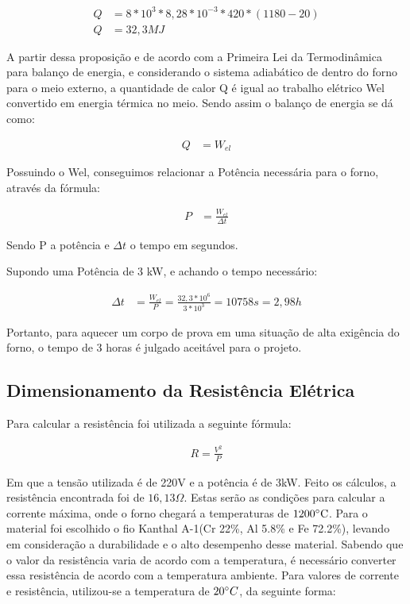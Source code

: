\begin{align}
Q &= 8*10^{3}*8,28*10^{-3}*420*(1180-20) \\
\nonumber
Q &= 32,3 MJ
\end{align}

A partir dessa proposição e de acordo com a Primeira Lei da Termodinâmica para balanço de energia, e considerando o sistema adiabático de dentro do forno para o meio externo, a quantidade de calor Q é igual ao trabalho elétrico Wel convertido em energia térmica no meio. Sendo assim o balanço de energia se dá como:

\begin{align}
Q &= W_{el}
\end{align}

Possuindo o Wel, conseguimos relacionar a Potência necessária para o forno, através da fórmula:

\begin{align}
P &= \frac{W_{el}}{\Delta t}
\end{align}

Sendo P a potência e $\Delta t$ o tempo em segundos.

Supondo uma Potência de 3 kW, e achando o tempo necessário:

\begin{align}
\Delta t &= \frac{W_{el}}{P} = \frac{32,3*10^6}{3*10^3} = 10758s = 2,98h
\end{align}

Portanto, para aquecer um corpo de prova em uma situação de alta exigência do forno, o tempo de 3 horas é julgado aceitável para o projeto.

\subsection{Dimensionamento da Resistência Elétrica}

Para calcular a resistência foi utilizada a seguinte fórmula:

\begin{align}
R = \frac{V^2}{P}
\end{align}

Em que a tensão utilizada é de 220V e a potência é de 3kW. Feito os cálculos, a resistência encontrada foi de $16,13 \Omega$. Estas serão as condições para calcular a corrente máxima, onde o forno chegará a temperaturas de $1200 \degree \text{C}$. Para o material foi escolhido o fio Kanthal A-1(Cr 22\%, Al 5.8\% e Fe 72.2\%), levando em consideração a durabilidade e o alto desempenho desse material. Sabendo que o valor da resistência varia de acordo com a temperatura, é necessário converter essa resistência de acordo com a temperatura ambiente. Para valores de corrente e resistência, utilizou-se a temperatura de $20 \degree C$, da seguinte forma:

